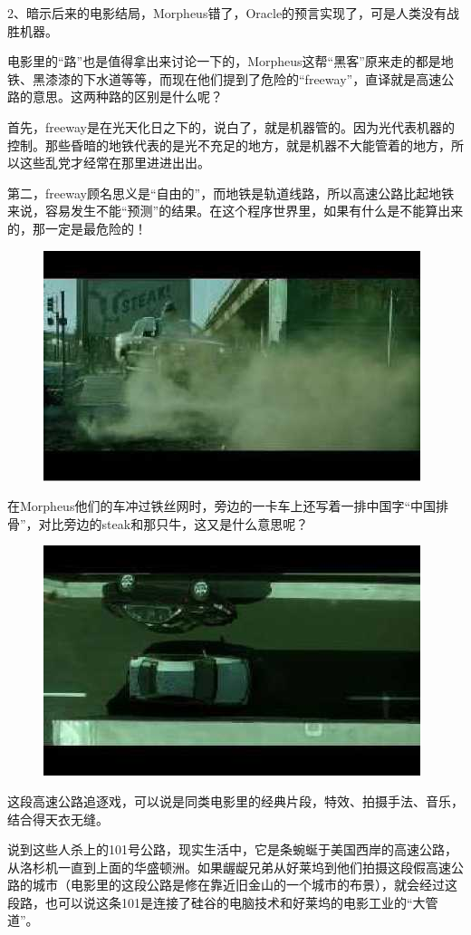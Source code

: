 \documentclass{ctexart}
\begin{document}
2、暗示后来的电影结局，Morpheus错了，Oracle的预言实现了，可是人类没有战胜机器。

电影里的“路”也是值得拿出来讨论一下的，Morpheus这帮“黑客”原来走的都是地铁、黑漆漆的下水道等等，而现在他们提到了危险的“freeway”，直译就是高速公路的意思。这两种路的区别是什么呢？

首先，freeway是在光天化日之下的，说白了，就是机器管的。因为光代表机器的控制。那些昏暗的地铁代表的是光不充足的地方，就是机器不大能管着的地方，所以这些乱党才经常在那里进进出出。

第二，freeway顾名思义是“自由的”，而地铁是轨道线路，所以高速公路比起地铁来说，容易发生不能“预测”的结果。在这个程序世界里，如果有什么是不能算出来的，那一定是最危险的！

\begin{figure}[htb]
\centering
\includegraphics[width=0.5\linewidth]{fig/read_reloaded-131}
\end{figure}

在Morpheus他们的车冲过铁丝网时，旁边的一卡车上还写着一排中国字“中国排骨”，对比旁边的steak和那只牛，这又是什么意思呢？

\begin{figure}[htb]
\centering
\includegraphics[width=0.5\linewidth]{fig/read_reloaded-132}
\end{figure}

这段高速公路追逐戏，可以说是同类电影里的经典片段，特效、拍摄手法、音乐，结合得天衣无缝。

说到这些人杀上的101号公路，现实生活中，它是条蜿蜒于美国西岸的高速公路，从洛杉机一直到上面的华盛顿洲。如果龌龊兄弟从好莱坞到他们拍摄这段假高速公路的城市（电影里的这段公路是修在靠近旧金山的一个城市的布景），就会经过这段路，也可以说这条101是连接了硅谷的电脑技术和好莱坞的电影工业的“大管道”。
\end{document}
